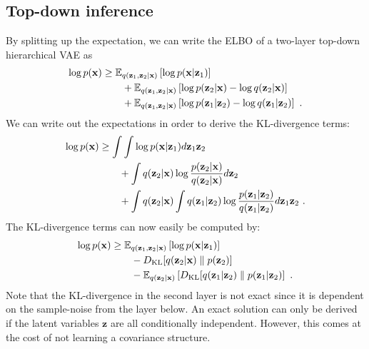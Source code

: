 {\subsection{Top-down inference}
    By splitting up the expectation, we can write the ELBO of a two-layer top-down hierarchical VAE as
    \begin{align}
        \log p({\mathbf{x}}) &\ge \mathbb{E}_{q({\mathbf{z}}_1, {\mathbf{z}}_2|{\mathbf{x}})} \left[ \log p({\mathbf{x}}|{\mathbf{z}}_1) \right] \\ 
        &\qquad + \mathbb{E}_{q({\mathbf{z}}_1,{\mathbf{z}}_2|{\mathbf{x}})} \left[ \log p({\mathbf{z}}_2|{\mathbf{x}}) - \log q({\mathbf{z}}_2|{\mathbf{x}}) \right] \notag \\
        &\qquad + \mathbb{E}_{q({\mathbf{z}}_1,{\mathbf{z}}_2|{\mathbf{x}})} \left[ \log p({\mathbf{z}}_1|{\mathbf{z}}_2) - \log q({\mathbf{z}}_1|{\mathbf{z}}_2) \right] \notag \ .
    \end{align}
    We can write out the expectations in order to derive the KL-divergence terms:
    \begin{align}
        \log p({\mathbf{x}}) &\ge \int \int \log p({\mathbf{x}}|{\mathbf{z}}_1) d{\mathbf{z}}_1{\mathbf{z}}_2 \\
        &\qquad + \int q({\mathbf{z}}_2|{\mathbf{x}}) \log \frac{p({\mathbf{z}}_2|{\mathbf{x}})}{q({\mathbf{z}}_2|{\mathbf{x}})} d{\mathbf{z}}_2 \notag \\ 
        &\qquad + \int q({\mathbf{z}}_2|{\mathbf{x}}) \int q({\mathbf{z}}_1|{\mathbf{z}}_2) \log \frac{p({\mathbf{z}}_1|{\mathbf{z}}_2)}{q({\mathbf{z}}_1|{\mathbf{z}}_2)} d{\mathbf{z}}_1{\mathbf{z}}_2 \notag \ .
    \end{align}
    The KL-divergence terms can now easily be computed by:
    \begin{align}
        \log p({\mathbf{x}}) &\ge \mathbb{E}_{q({\mathbf{z}}_1, {\mathbf{z}}_2|{\mathbf{x}})} \left[ \log p({\mathbf{x}}|{\mathbf{z}}_1) \right] \\
    &\qquad - D_\text{KL}[q({\mathbf{z}}_2|{\mathbf{x}})\parallel p({\mathbf{z}}_2)] \notag \\ 
    &\qquad - \mathbb{E}_{q({\mathbf{z}}_2|{\mathbf{x}})}\left[D_\text{KL}[q({\mathbf{z}}_1|{\mathbf{z}}_2)\parallel p({\mathbf{z}}_1|{\mathbf{z}}_2)\right] \notag \ .
\end{align}
Note that the KL-divergence in the second layer is not exact since it is dependent on the sample-noise from the layer below. An exact solution can only be derived if the latent variables $\mathbf{z}$ are all conditionally independent. However, this comes at the cost of not learning a covariance structure.


}
